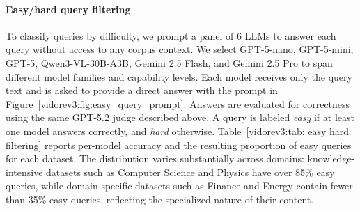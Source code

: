 \paragraph{Easy/hard query filtering} To classify queries by difficulty, we prompt a panel of 6 LLMs to answer each query without access to any corpus context. We select GPT-5-nano, GPT-5-mini, GPT-5, Qwen3-VL-30B-A3B, Gemini 2.5 Flash, and Gemini 2.5 Pro to span different model families and capability levels. Each model receives only the query text and is asked to provide a direct answer with the prompt in Figure~\ref{vidorev3:fig:easy_query_prompt}. Answers are evaluated for correctness using the same GPT-5.2 judge described above. A query is labeled \textit{easy} if at least one model answers correctly, and \textit{hard} otherwise. Table~\ref{vidorev3:tab: easy hard filtering} reports per-model accuracy and the resulting proportion of easy queries for each dataset. The distribution varies substantially across domains: knowledge-intensive datasets such as Computer Science and Physics have over 85\% easy queries, while domain-specific datasets such as Finance and Energy contain fewer than 35\% easy queries, reflecting the specialized nature of their content.




